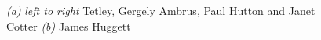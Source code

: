 \begin{figure}[t!]
\begin{subfigure}[t]{0.59\textwidth}
 \caption{}\label{fig:Huggy}
\end{subfigure}
    \caption{
    \emph{(a)} \emph{left to right} Tetley, Gergely Ambrus, Paul Hutton and Janet Cotter 
     \emph{(b)} James Huggett  }
\end{figure}
